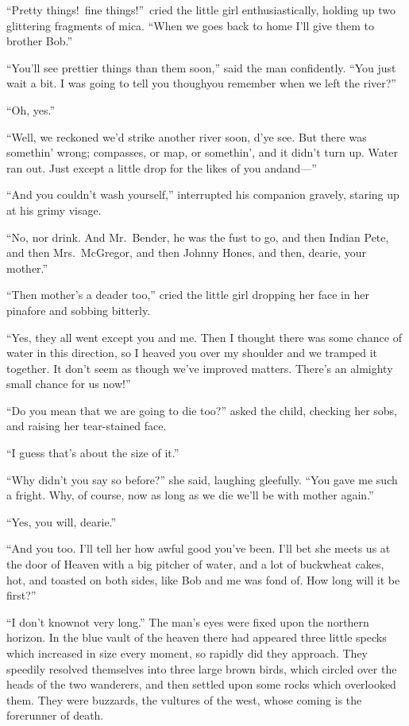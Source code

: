 \documentclass[12pt,english]{book}
\begin{document}
{}``Pretty things!\ fine things!''\ cried the little girl enthusiastically,
holding up two glittering fragments of mica. {}``When we goes back
to home I'll give them to brother Bob.''

{}``You'll see prettier things than them soon,'' said the man confidently.
{}``You just wait a bit. I was going to tell you though\mdsh{---}you
remember when we left the river?''

{}``Oh, yes.''

{}``Well, we reckoned we'd strike another river soon, d'ye see. But
there was somethin' wrong; compasses, or map, or somethin', and it
didn't turn up. Water ran out. Just except a little drop for the likes
of you and\mdsh{---}and\mbox{---}''

{}``And you couldn't wash yourself,'' interrupted his companion
gravely, staring up at his grimy visage.

{}``No, nor drink. And Mr.\ Bender, he was the fust to go, and then
Indian Pete, and then Mrs.\ McGregor, and then Johnny Hones, and
then, dearie, your mother.''

{}``Then mother's a deader too,'' cried the little girl dropping
her face in her pinafore and sobbing bitterly.

{}``Yes, they all went except you and me. Then I thought there was
some chance of water in this direction, so I heaved you over my shoulder
and we tramped it together. It don't seem as though we've improved
matters. There's an almighty small chance for us now!''

{}``Do you mean that we are going to die too?'' asked the child,
checking her sobs, and raising her tear-stained face.

{}``I guess that's about the size of it.''

{}``Why didn't you say so before?'' she said, laughing gleefully.
{}``You gave me such a fright. Why, of course, now as long as we
die we'll be with mother again.''

{}``Yes, you will, dearie.''

{}``And you too. I'll tell her how awful good you've been. I'll bet
she meets us at the door of Heaven with a big pitcher of water, and
a lot of buckwheat cakes, hot, and toasted on both sides, like Bob
and me was fond of. How long will it be first?''

{}``I don't know\mdsh{---}not very long.'' The man's eyes were
fixed upon the northern horizon. In the blue vault of the heaven there
had appeared three little specks which increased in size every moment,
so rapidly did they approach. They speedily resolved themselves into
three large brown birds, which circled over the heads of the two wanderers,
and then settled upon some rocks which overlooked them. They were
buzzards, the vultures of the west, whose coming is the forerunner
of death.
\end{document}

